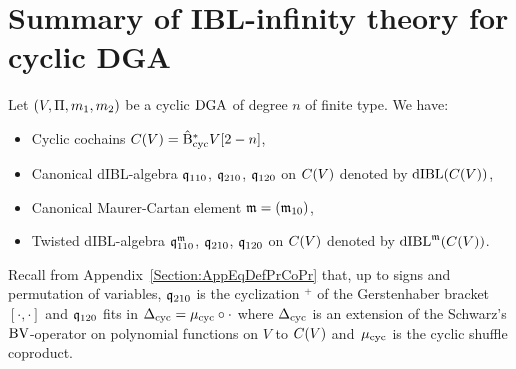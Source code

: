 \documentclass[\MainFolder/Text.tex]{subfiles}
\begin{document}
\section{Summary of IBL-infinity theory for cyclic DGA}\label{BV:Summary}
Let $(V,\Pi,m_1,m_2)$ be a cyclic $\mathrm{DGA}$ of degree $n$ of finite type. We have:
\begin{itemize}
    \item Cyclic cochains $C(V) = \hat{\mathrm{B}}_{\mathrm{cyc}}^* V[2-n]$,
    \item Canonical dIBL-algebra $\mathfrak{q}_{110}$, $\mathfrak{q}_{210}$, $\mathfrak{q}_{120}$ on $C(V)$ denoted by $\mathrm{dIBL}(C(V))$,
    \item Canonical Maurer-Cartan element $\mathfrak{m} = (\mathfrak{m}_{10})$,
    \item Twisted dIBL-algebra $\mathfrak{q}_{110}^{\mathfrak{m}}$, $\mathfrak{q}_{210}$, $\mathfrak{q}_{120}$ on $C(V)$ denoted by $\mathrm{dIBL}^{\mathfrak{m}}(C(V))$.
\end{itemize}
Recall from Appendix~\ref{Section:AppEqDefPrCoPr} that, up to signs and permutation of variables, $\mathfrak{q}_{210}$ is the cyclization ${}^+$ of the Gerstenhaber bracket $[\cdot,\cdot]$ and $\mathfrak{q}_{120}$ fits in $\operatorname{\Delta}_{\mathrm{cyc}} = \mu_{\mathrm{cyc}}\circ \cdot$ where $\operatorname{\Delta}_{\mathrm{cyc}}$ is an extension of the Schwarz's $\mathrm{BV}$-operator on polynomial functions on $V$ to $C(V)$ and~$\mu_{\mathrm{cyc}}$ is the cyclic shuffle coproduct. 
\end{document}
